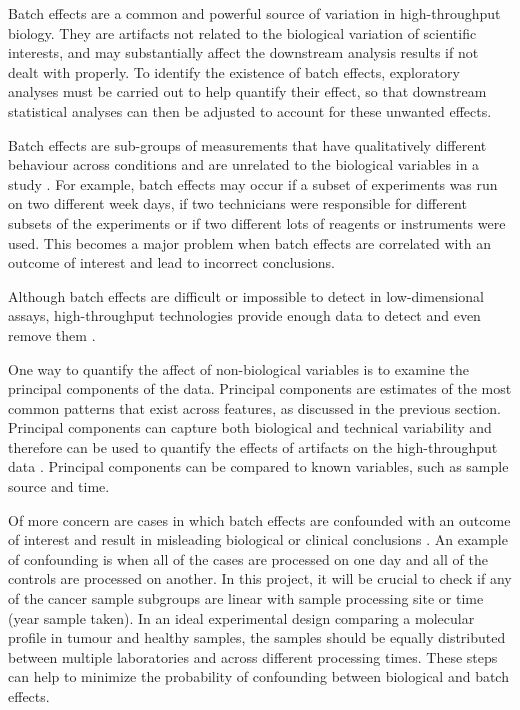Batch effects are a common and powerful source of variation in high-throughput biology.  They are artifacts not related to the biological variation of scientific interests, and may substantially affect the downstream analysis results if not dealt with properly. 
To identify the existence of batch effects, exploratory analyses must be carried out to help quantify their effect, so that downstream statistical analyses can then be adjusted to account for these unwanted effects. 
 
Batch effects are sub-groups of measurements that have qualitatively different behaviour across conditions and are unrelated to the biological variables in a study \cite{Leek2010}. For example, batch effects may occur if a subset of experiments was run on two different week days, if two technicians were responsible for different subsets of the experiments or if two different lots of reagents or instruments were used. This becomes a major problem when batch effects are correlated with an outcome of interest and lead to incorrect conclusions.
 
Although batch effects are difficult or impossible to detect in low-dimensional assays, high-throughput technologies provide enough data to detect and even remove them \cite{Leek2010}. 
 
One way to quantify the affect of non-biological variables is to examine the principal components of the data. Principal components are estimates of the most common patterns that exist across features, as discussed in the previous section. Principal components can capture both biological and technical variability and therefore can be used to quantify the effects of artifacts on the high-throughput data \cite{LeekCapturingAnalysis}. Principal components can be compared to known variables, such as sample source and time. 
 
Of more concern are cases in which batch effects are confounded with an outcome of interest and result in misleading biological or clinical conclusions \cite{Leek2010}. An example of confounding is when all of the cases are processed on one day and all of the controls are processed on another. In this project, it will be crucial to check if any of the cancer sample subgroups are linear with sample processing site or time (year sample taken). In an ideal experimental design comparing a molecular profile in tumour and healthy samples, the samples should be equally distributed between multiple laboratories and across different processing times. These steps can help to minimize the probability of confounding between biological and batch effects.
 
